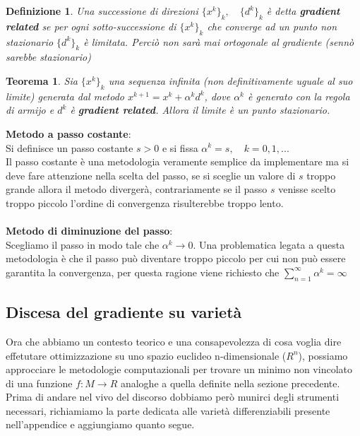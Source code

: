 \documentclass[a4paper, 12pt]{article}
\newtheorem{theorem}{Teorema}
\newtheorem{definition}{Definizione}
\begin{document}
\begin{definition}
Una successione di direzioni $\{x^k\}_k, \quad \{d^k\}_k$ è detta \textbf{gradient related} se per ogni sotto-successione di $\{x^k\}_k$ che converge ad un punto non stazionario $\{d^k\}_k$ è limitata. Perciò non sarà mai ortogonale al gradiente (sennò sarebbe stazionario)
\end{definition}
\begin{theorem}
Sia $\{x^k\}_k$ una sequenza infinita (non definitivamente uguale al suo limite) generata dal metodo $x^{k+1} = x^k + \alpha^k d^k$, dove $\alpha^k$ è generato con la regola di armijo e $d^k$ è \textbf{gradient related}. Allora il limite è un punto stazionario.
\end{theorem}
\textbf{Metodo a passo costante}:\\
Si definisce un passo costante $s > 0$ e si fissa $\alpha^k = s, \quad k = 0,1, ...$\\
Il passo costante è una metodologia veramente semplice da implementare ma si deve fare attenzione nella scelta del passo, se si sceglie un valore di $s$ troppo grande allora il metodo divergerà, contrariamente se il passo $s$ venisse scelto troppo piccolo l'ordine di convergenza risulterebbe troppo lento.\\\\
\textbf{Metodo di diminuzione del passo}:\\
Scegliamo il passo in modo tale che $\alpha^k \rightarrow 0$. Una problematica legata a questa metodologia è che il passo può diventare troppo piccolo per cui non può essere garantita la convergenza, per questa ragione viene richiesto che $\sum_{n=1}^{\infty} \alpha^k = \infty$

\subsection{Discesa del gradiente su varietà}
Ora che abbiamo un contesto teorico e una consapevolezza di cosa voglia dire effetutare ottimizzazione su uno spazio euclideo n-dimensionale ($R^n$), possiamo approcciare le metodologie computazionali per trovare un minimo non vincolato di una funzione $f:M \to R$ analoghe a quella definite nella sezione precedente. Prima di andare nel vivo del discorso dobbiamo però munirci degli strumenti necessari, richiamiamo la parte dedicata alle varietà differenziabili presente nell'appendice e aggiungiamo quanto segue.
\end{document}

